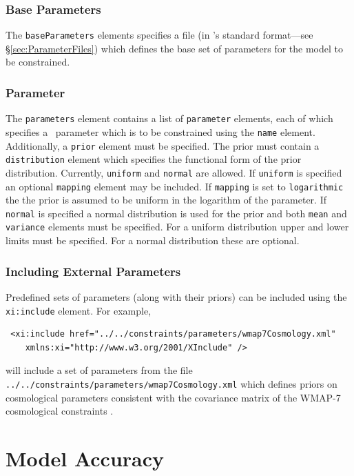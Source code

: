 \subsubsection{Base Parameters}

The {\tt baseParameters} elements specifies a file (in \glc's standard format---see \S\ref{sec:ParameterFiles}) which defines the base set of parameters for the model to be constrained.

\subsubsection{Parameter}

The {\tt parameters} element contains a list of {\tt parameter} elements, each of which specifies a \glc\ parameter which is to be constrained using the {\tt name} element. Additionally, a {\tt prior} element must be specified. The prior must contain a {\tt distribution} element which specifies the functional form of the prior distribution. Currently, {\tt uniform} and {\tt normal} are allowed. If {\tt uniform} is specified an optional {\tt mapping} element may be included. If {\tt mapping} is set to {\tt logarithmic} the the prior is assumed to be uniform in the logarithm of the parameter. If {\tt normal} is specified a normal distribution is used for the prior and both {\tt mean} and {\tt variance} elements must be specified. For a uniform distribution upper and lower limits must be specified. For a normal distribution these are optional.

\subsubsection{Including External Parameters}

Predefined sets of parameters (along with their priors) can be included using the {\tt xi:include} element. For example,
\begin{verbatim}
 <xi:include href="../../constraints/parameters/wmap7Cosmology.xml"
    xmlns:xi="http://www.w3.org/2001/XInclude" />
\end{verbatim}
will include a set of parameters from the file {\tt ../../constraints/parameters/wmap7Cosmology.xml} which defines priors on cosmological parameters consistent with the covariance matrix of the WMAP-7 cosmological constraints \citep{komatsu_seven-year_2010}.

\section{Model Accuracy}\label{sec:ModelAccuracy}

